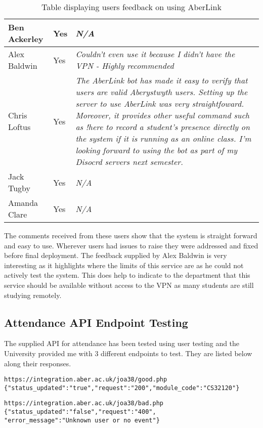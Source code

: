 \begin{table}[H]
\begin{tabular}{|p{2cm}|p{2cm}|p{10cm}|}
        \hline
        Ben Ackerley & \color{ForestGreen}Yes & \textit{N/A} \\
        \hline
        Alex Baldwin & \color{ForestGreen}Yes & \textit{Couldn't even use it because I didn't have the VPN - Highly recommended} \\
        \hline
        Chris Loftus & \color{ForestGreen}Yes & \textit{The AberLink bot has made it easy to verify that users are valid Aberystwyth users. Setting up the server to use AberLink was very straightfoward. Moreover, it provides other useful command such as !here to record a student's presence directly on the system if it is running as an online class. I'm looking forward to using the bot as part of my Disocrd servers next semester.} \\
        \hline
        Jack Tugby & \color{ForestGreen}Yes & \textit{N/A} \\
        \hline
        Amanda Clare & \color{ForestGreen}Yes & \textit{N/A} \\
        \hline
    \end{tabular}
    \caption{Table displaying users feedback on using AberLink}
    \label{tab:service-response}
\end{table}

The comments received from these users show that the system is straight forward and easy to use. Wherever users had issues to raise they were addressed and fixed before final deployment. The feedback supplied by Alex Baldwin is very interesting as it highlights where the limits of this service are as he could not actively test the system. This does help to indicate to the department that this service should be available without access to the VPN as many students are still studying remotely.

\subsection{Attendance API Endpoint Testing}
The supplied API for attendance has been tested using user testing and the University provided me with 3 different endpoints to test. They are listed below along their responses.

\begin{verbatim}
https://integration.aber.ac.uk/joa38/good.php
{"status_updated":"true","request":"200","module_code":"CS32120"}    
\end{verbatim}

\begin{verbatim}
https://integration.aber.ac.uk/joa38/bad.php
{"status_updated":"false","request":"400",
"error_message":"Unknown user or no event"}
\end{verbatim}

